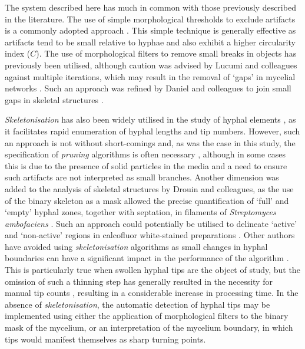 The system described here has much in common with those previously described in the literature. The use of simple morphological thresholds to exclude artifacts is a commonly adopted approach \cite{lucumi2005,lecault2007}. This simple technique is generally effective as artifacts tend to be small relative to hyphae and also exhibit a higher circularity index ($C$). The use of morphological filters to remove small breaks in objects has previously been utilised, although caution was advised by Lucumi and colleagues against multiple iterations, which may result in the removal of \lq gaps' in mycelial networks \cite{lucumi2005}. Such an approach was refined by Daniel and colleagues to join small gaps in skeletal structures \cite{daniel1995}.

\emph{Skeletonisation} has also been widely utilised in the study of hyphal elements \cite{tucker1992,spohr1998,denser-pamboukian2002,rahardjo2005b,slaba2005,bizukojc2006,lecault2007}, as it facilitates rapid enumeration of hyphal lengths and tip numbers. However, such an approach is not without short-comings and, as was the case in this study, the specification of \emph{pruning} algorithms is often necessary \cite{drouin1997,spohr1998,denser-pamboukian2002,lucumi2005,lecault2007}, although in some cases this is due to the presence of solid particles in the media and a need to ensure such artifacts are not interpreted as small branches. Another dimension was added to the analysis of skeletal structures by Drouin and colleagues, as the use of the binary skeleton as a mask allowed the precise quantification of \lq full' and \lq empty' hyphal zones, together with septation, in filaments of \emph{Streptomyces ambofaciens} \cite{drouin1997}. Such an approach could potentially be utilised to delineate \lq active' and \lq non-active' regions in calcofluor white-stained preparations \cite{amanullah2002}. Other authors have avoided using \emph{skeletonisation} algorithms as small changes in hyphal boundaries can have a significant impact in the performance of the algorithm \cite{sonka1993}. This is particularly true when swollen hyphal tips are the object of study, but the omission of such a thinning step has generally resulted in the necessity for manual tip counts \cite{muller2003}, resulting in a considerable increase in processing time. In the absence of \emph{skeletonisation}, the automatic detection of hyphal tips may be implemented using either the application of morphological filters to the binary mask of the mycelium, or an interpretation of the mycelium boundary, in which tips would manifest themselves as sharp turning points.

